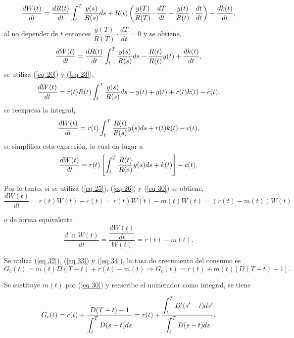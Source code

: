 $$\dfrac{dW(t)}{dt}= \displaystyle \dfrac{d R(t)}{dt} \int_t^T \dfrac{y(s)}{R(s)} ds  + R(t)  \left(  \dfrac{y(T)}{R(T)}\cdot \dfrac{dT}{dt} -   \dfrac{y(t)}{R(t)}\cdot \dfrac{dt}{dt}   \right)+\dfrac{dk(t)}{dt},$$
al no depender de $t$ entonces $\dfrac{y(T)}{R(T)}\cdot \dfrac{dT}{dt}=0$ y se obtiene,
$$ \dfrac{d W(t)}{dt}= \dfrac{d  R(t)}{dt} \displaystyle  \int_t^T \dfrac{y(s)}{R(s)}ds - \dfrac{R(t)}{R(t)}y(t)+ \dfrac{dk(t)}{dt},$$
se utiliza (\ref{eq 20}) y (\ref{eq 23}),
$$ \dfrac{d W(t)}{dt}= r(t) R(t) \displaystyle  \int_t^T \dfrac{y(s)}{R(s)}ds - y(t)+ y(t)+r(t)k(t)-c(t),$$
se reexpresa la integral,
$$ \dfrac{d W(t)}{dt}= r(t)  \displaystyle  \int_t^T \dfrac{R(t)}{R(s)}y(s)ds +r(t)k(t)-c(t),$$
se simplifica esta expresión, lo cual da lugar a
$$\dfrac{d W(t)}{dt}=r(t) \left[ \displaystyle \int_t^T \dfrac{R(t)}{R(s)}y(s) ds +k(t) \right]-c(t).$$

\noindent Por lo tanto, si se utiliza (\ref{eq 25}), (\ref{eq 26}) y (\ref{eq 30}) se obtiene,
$$\dfrac{d W(t)}{dt}=r(t) W(t)-c(t)
=r(t) W(t)-m(t) W(t)
= (r(t)-m(t))W(t)$$


\noindent o de forma equivalente
\begin{equation}
\label{eq 34}
    \dfrac{d \ln W(t)}{dt}= \dfrac{\dfrac{d W(t)}{dt}}{W(t)} = r(t)-m(t).
\end{equation}

\noindent Se utiliza (\ref{eq 32}), (\ref{eq 33}) y (\ref{eq 34}), la tasa de crecimiento del consumo es
$$G_c(t)=m(t) D(T-t)+ r(t)-m(t)\Rightarrow
G_c(t)=r(t)+ m(t) \left[D(T-t)-1 \right].$$

\noindent Se sustituye $m(t)$ por (\ref{eq 30}) y reescribe el numerador como integral, se tiene

\begin{equation}
\label{eq 35}
    G_c(t)=r(t)+ \dfrac{D(T-t)-1 }{\displaystyle \int_t^T D(s-t) ds}
    =r(t)+ \dfrac{\displaystyle \int_t^T D'(s'-t) ds'}{\displaystyle \int_t^T D(s-t) ds},
\end{equation}

